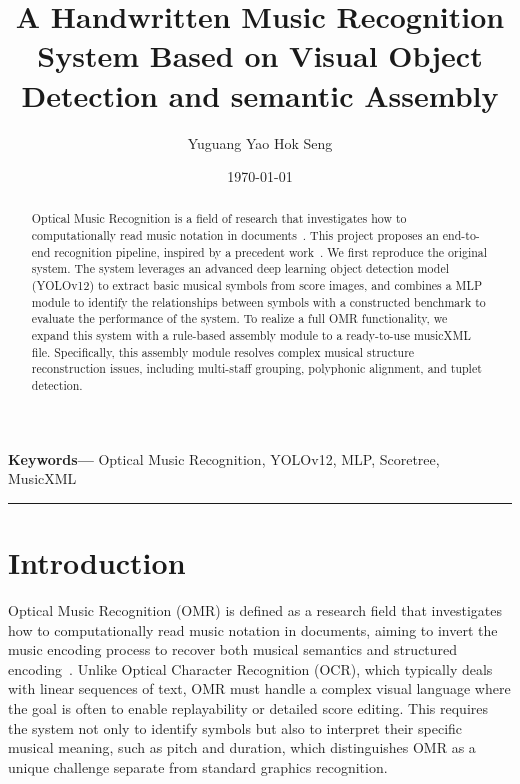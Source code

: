 \documentclass[twocolumn, a4paper, 10pt]{article}
\title{\textbf{A Handwritten Music Recognition System Based on Visual Object Detection and semantic Assembly}}
\author{Yuguang Yao \quad Hok Seng}
\date{\today}
\begin{document}
\maketitle

\begin{abstract}
Optical Music Recognition is a field of research that investigates how to computationally
read music notation in documents~\cite{Calvo_Zaragoza_2020}. This project proposes an end-to-end recognition pipeline, inspired by a precedent work~\cite{yang2024completeomrsolution}. We first reproduce the original system. The system leverages an advanced deep learning object detection model (YOLOv12) to extract basic musical symbols from score images, and combines a MLP module to identify the relationships between symbols with a constructed benchmark to evaluate the performance of the system. To realize a full OMR functionality, we expand this system with a rule-based assembly module to a ready-to-use musicXML file. Specifically, this assembly module resolves complex musical structure reconstruction issues, including multi-staff grouping, polyphonic alignment, and tuplet detection. 
\end{abstract}

\vspace{0.3cm}
\textbf{Keywords---} Optical Music Recognition, YOLOv12,  MLP, Scoretree, MusicXML
\vspace{0.3cm}
\hrule
\vspace{0.5cm}

\section{Introduction}
Optical Music Recognition (OMR) is defined as a research field that investigates how to computationally read music notation in documents, aiming to invert the music encoding process to recover both musical semantics and structured encoding~\cite{Calvo_Zaragoza_2020}. Unlike Optical Character Recognition (OCR), which typically deals with linear sequences of text, OMR must handle a complex visual language where the goal is often to enable replayability or detailed score editing. This requires the system not only to identify symbols but also to interpret their specific musical meaning, such as pitch and duration, which distinguishes OMR as a unique challenge separate from standard graphics recognition.
\end{document}
